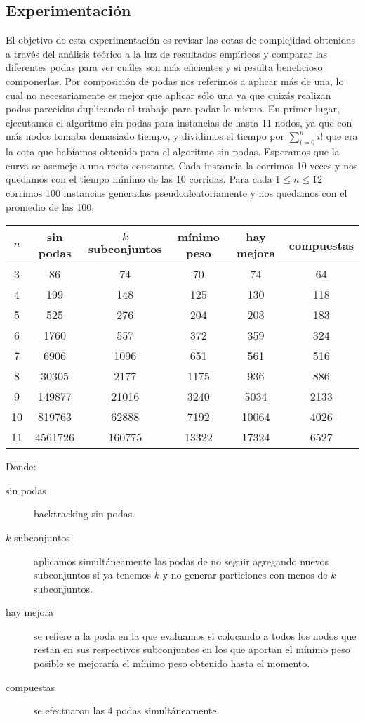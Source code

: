 \subsection{Experimentación}
El objetivo de esta experimentación es revisar las cotas de complejidad obtenidas a través del análisis teórico
a la luz de resultados empíricos y comparar las diferentes podas para ver cuáles son más eficientes y si 
resulta beneficioso componerlas. Por composición de podas nos referimos a aplicar más de una, lo cual no necesariamente
es mejor que aplicar sólo una ya que quizás realizan podas parecidas duplicando el trabajo para podar lo mismo.
En primer lugar, ejecutamos el algoritmo sin podas para instancias de hasta 11 nodos, ya que con más nodos
tomaba demasiado tiempo, y dividimos el tiempo por $\sum_{i=0}^ni!$ que era la cota que habíamos
obtenido para el algoritmo sin podas. Esperamos que la curva se asemeje a una recta constante. Cada instancia
la corrimos 10 veces y nos quedamos con el tiempo mínimo de las 10 corridas. Para cada $1 \leq n \leq 12$ corrimos
100 instancias generadas pseudoaleatoriamente y nos quedamos con el promedio de las 100:
\begin{center}
  \begin{tabular}{ c | c | c | c | c | c}
    $n$ & sin podas & $k$ subconjuntos & mínimo peso & hay mejora & compuestas \tabularnewline \hline
    3 & 86 & 74 & 70 & 74 & 64 \tabularnewline \hline
    4 & 199 & 148 & 125 & 130 & 118 \tabularnewline \hline
    5 & 525 & 276 & 204 & 203 & 183 \tabularnewline \hline
    6 & 1760 & 557 & 372 & 359 & 324 \tabularnewline \hline 
    7 & 6906 & 1096 & 651 & 561 & 516 \tabularnewline \hline 
    8 & 30305 & 2177 & 1175 & 936 & 886 \tabularnewline \hline
    9 & 149877 & 21016 & 3240 & 5034 & 2133 \tabularnewline \hline
    10 & 819763 & 62888 & 7192 & 10064 & 4026 \tabularnewline \hline
    11 & 4561726 & 160775 & 13322 & 17324 & 6527
  \end{tabular}
\end{center}
Donde:
\begin{description}
  \item[sin podas] backtracking sin podas.
  \item[$k$ subconjuntos] aplicamos simultáneamente las podas de no seguir agregando nuevos subconjuntos si ya tenemos
    $k$ y no generar particiones con menos de $k$ subconjuntos.
  \item[hay mejora] se refiere a la poda en la que evaluamos si colocando a todos los nodos que restan en sus respectivos
    subconjuntos en los que aportan el mínimo peso posible se mejoraría el mínimo peso obtenido hasta el momento.
  \item[compuestas] se efectuaron las 4 podas simultáneamente.
\end{description}

